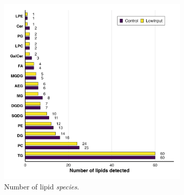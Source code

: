 \documentclass[10pt,letterpaper]{article}
\begin{document}
\begin{figure}[htp]
  \centering

  \begin{subfigure}[t]{0.48\textwidth}
    \includegraphics[width=\linewidth]{fig/supp/SuppFig_3A_Lipid_Counts.png}
    \caption{Number of lipid \textit{species}.}
    \label{fig:S3A}
  \end{subfigure}\hfill
  \begin{subfigure}[t]{0.48\textwidth}

\end{subfigure}
\end{figure}
\end{document}
